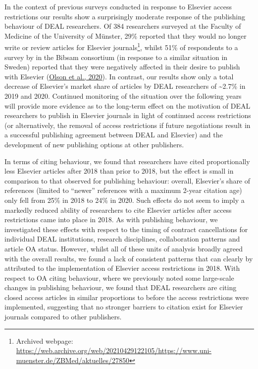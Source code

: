 \documentclass[
]{article}
\begin{document}
In the context of previous surveys conducted in response to Elsevier access restrictions our results show a surprisingly moderate response of the publishing behaviour of DEAL researchers. Of 384 researchers surveyed at the Faculty of Medicine of the University of Münster, 29\% reported that they would no longer write or review articles for Elsevier journals\footnote{Archived webpage: \url{https://web.archive.org/web/20210429122105/https://www.uni-muenster.de/ZBMed/aktuelles/27850}}, whilst 51\% of respondents to a survey by in the Bibsam consortium (in response to a similar situation in Sweden) reported that they were negatively affected in their desire to publish with Elsevier (\href{http://doi.org/10.1629/uksg.507}{Olson et al., 2020}). In contrast, our results show only a total decrease of Elsevier's market share of articles by DEAL researchers of \textasciitilde2.7\% in 2019 and 2020. Continued monitoring of the situation over the following years will provide more evidence as to the long-term effect on the motivation of DEAL researchers to publish in Elsevier journals in light of continued access restrictions (or alternatively, the removal of access restrictions if future negotiations result in a successful publishing agreement between DEAL and Elsevier) and the development of new publishing options at other publishers.

In terms of citing behaviour, we found that researchers have cited proportionally less Elsevier articles after 2018 than prior to 2018, but the effect is small in comparison to that observed for publishing behaviour: overall, Elsevier's share of references (limited to ``newer'' references with a maximum 2-year citation age) only fell from 25\% in 2018 to 24\% in 2020. Such effects do not seem to imply a markedly reduced ability of researchers to cite Elsevier articles after access restrictions came into place in 2018. As with publishing behaviour, we investigated these effects with respect to the timing of contract cancellations for individual DEAL institutions, research disciplines, collaboration patterns and article OA status. However, whilst all of these units of analysis broadly agreed with the overall results, we found a lack of consistent patterns that can clearly by attributed to the implementation of Elsevier access restrictions in 2018. With respect to OA citing behaviour, where we previously noted some large-scale changes in publishing behaviour, we found that DEAL researchers are citing closed access articles in similar proportions to before the access restrictions were implemented, suggesting that no stronger barriers to citation exist for Elsevier journals compared to other publishers.
\end{document}
